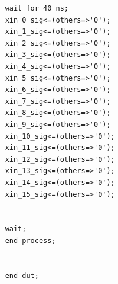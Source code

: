 \documentclass[a4paper, titlepage]{article}
\begin{document}
\begin{description}
\begin{verbatim}
	wait for 40 ns;
	xin_0_sig<=(others=>'0');
	xin_1_sig<=(others=>'0');
	xin_2_sig<=(others=>'0');
	xin_3_sig<=(others=>'0');
	xin_4_sig<=(others=>'0');
	xin_5_sig<=(others=>'0');
	xin_6_sig<=(others=>'0');
	xin_7_sig<=(others=>'0');
	xin_8_sig<=(others=>'0');
	xin_9_sig<=(others=>'0');
	xin_10_sig<=(others=>'0');
	xin_11_sig<=(others=>'0');
	xin_12_sig<=(others=>'0');
	xin_13_sig<=(others=>'0');
	xin_14_sig<=(others=>'0');
	xin_15_sig<=(others=>'0');


	wait;
	end process;
	
	
	end dut;

\end{verbatim}
\end{description}
\end{document}
